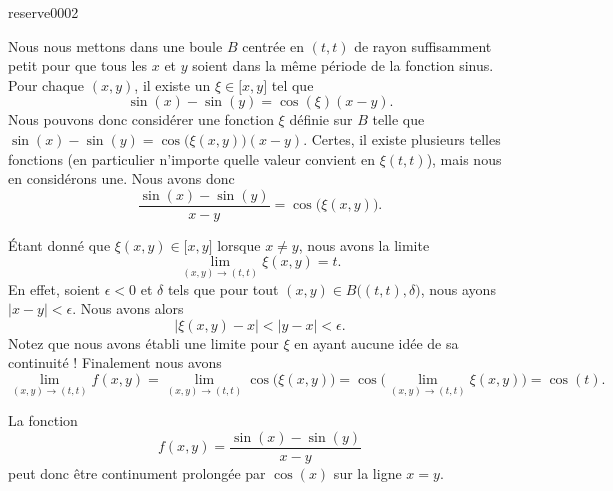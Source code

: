 

\begin{corrige}{reserve0002}

	Nous nous mettons dans une boule $B$ centrée en $(t,t)$ de rayon suffisamment petit pour que tous les $x$ et $y$ soient dans la même période de la fonction sinus. Pour chaque $(x,y)$, il existe un $\xi\in\mathopen[ x , y \mathclose]$ tel que
	\begin{equation}
		\sin(x)-\sin(y)=\cos(\xi)(x-y).
	\end{equation}
	Nous pouvons donc considérer une fonction $\xi$ définie sur $B$ telle que $\sin(x)-\sin(y)=\cos\big(\xi(x,y)\big)(x-y)$. Certes, il existe plusieurs telles fonctions (en particulier n'importe quelle valeur convient en $\xi(t,t)$), mais nous en considérons une. Nous avons donc
	\begin{equation}
		\frac{ \sin(x)-\sin(y) }{ x-y }=\cos\big( \xi(x,y) \big).
	\end{equation}
	
	Étant donné que $\xi(x,y)\in\mathopen[ x , y \mathclose]$ lorsque $x\neq y$, nous avons la limite
	\begin{equation}
		\lim_{(x,y)\to(t,t)}\xi(x,y)=t.
	\end{equation}
	En effet, soient $\epsilon<0$ et $\delta$ tels que pour tout $(x,y)\in B\big( (t,t),\delta \big)$, nous ayons $| x-y |<\epsilon$. Nous avons alors
	\begin{equation}
		\big| \xi(x,y)-x \big|<| y-x |<\epsilon.
	\end{equation}
	Notez que nous avons établi une limite pour $\xi$ en ayant aucune idée de sa continuité ! Finalement nous avons
	\begin{equation}
		\lim_{(x,y)\to(t,t)}f(x,y)=\lim_{(x,y)\to(t,t)}\cos\big( \xi(x,y) \big)=\cos\big( \lim_{(x,y)\to(t,t)}\xi(x,y) \big)=\cos(t).
	\end{equation}

	La fonction
	\begin{equation}
		f(x,y)=\frac{ \sin(x)-\sin(y) }{ x-y }
	\end{equation}
	peut donc être continument prolongée par $\cos(x)$ sur la ligne $x=y$.
	
\end{corrige}
